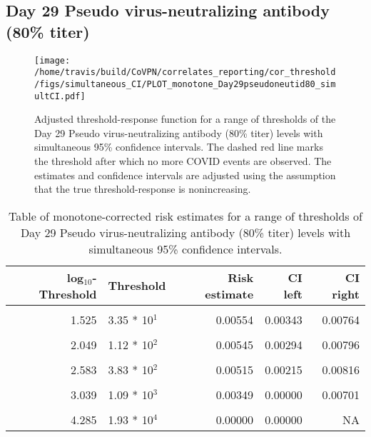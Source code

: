 \documentclass[]{book}
\theoremstyle{definition}
\theoremstyle{definition}
\theoremstyle{definition}
\newcommand{\1}{\mathbbm{1}}
\begin{document}
\clearpage

\clearpage

\clearpage

\hypertarget{day-29-pseudo-virus-neutralizing-antibody-80-titer-3}{%
\subsection{Day 29 Pseudo virus-neutralizing antibody (80\% titer)}\label{day-29-pseudo-virus-neutralizing-antibody-80-titer-3}}

\begin{figure}[H]
\centering
\texttt{[image: /home/travis/build/CoVPN/correlates\_reporting/cor\_threshold/figs/simultaneous\_CI/PLOT\_monotone\_Day29pseudoneutid80\_simultCI.pdf]}
\caption{Adjusted threshold-response function for a range of thresholds of the
  Day 29 Pseudo virus-neutralizing antibody (80\% titer) levels with simultaneous 95\% confidence intervals. The dashed red line marks the threshold after which no more COVID events are observed. The estimates and confidence intervals are adjusted using the assumption that the true threshold-response is nonincreasing.}
\end{figure}
\begin{table}[!h]

\caption{\label{tab:unnamed-chunk-409}Table of monotone-corrected risk estimates for a range of thresholds of Day 29 Pseudo virus-neutralizing antibody (80\% titer) levels with simultaneous 95\% confidence intervals.}
\centering
\begin{tabular}[t]{rlrrr}
\toprule
log$_{10}$-Threshold & Threshold & Risk estimate & CI left & CI right\\
\midrule
\cellcolor{gray!6}{0.699} & \cellcolor{gray!6}{5.00 * 10$^0$} & \cellcolor{gray!6}{0.00585} & \cellcolor{gray!6}{0.00382} & \cellcolor{gray!6}{0.00788}\\
1.525 & 3.35 * 10$^1$ & 0.00554 & 0.00343 & 0.00764\\
\cellcolor{gray!6}{1.840} & \cellcolor{gray!6}{6.92 * 10$^1$} & \cellcolor{gray!6}{0.00554} & \cellcolor{gray!6}{0.00314} & \cellcolor{gray!6}{0.00793}\\
2.049 & 1.12 * 10$^2$ & 0.00545 & 0.00294 & 0.00796\\
\cellcolor{gray!6}{2.276} & \cellcolor{gray!6}{1.89 * 10$^2$} & \cellcolor{gray!6}{0.00534} & \cellcolor{gray!6}{0.00262} & \cellcolor{gray!6}{0.00807}\\
2.583 & 3.83 * 10$^2$ & 0.00515 & 0.00215 & 0.00816\\
\cellcolor{gray!6}{2.785} & \cellcolor{gray!6}{6.10 * 10$^2$} & \cellcolor{gray!6}{0.00515} & \cellcolor{gray!6}{0.00129} & \cellcolor{gray!6}{0.00902}\\
3.039 & 1.09 * 10$^3$ & 0.00349 & 0.00000 & 0.00701\\
\cellcolor{gray!6}{3.351} & \cellcolor{gray!6}{2.24 * 10$^3$} & \cellcolor{gray!6}{0.00242} & \cellcolor{gray!6}{0.00000} & \cellcolor{gray!6}{0.00581}\\
4.285 & 1.93 * 10$^4$ & 0.00000 & 0.00000 & NA\\
\bottomrule
\end{tabular}
\end{table}

\clearpage


\end{document}
